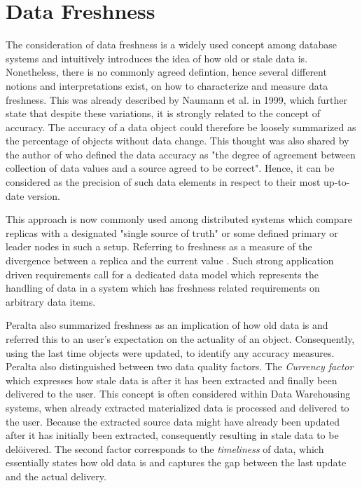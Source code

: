 \section{Data Freshness}
\label{sec:definition}
The consideration of data freshness is a widely used concept among database systems and intuitively introduces the idea of how old or stale data is.
Nonetheless, there is no commonly agreed defintion, hence several different notions and interpretations exist, on how to characterize and measure data freshness.
This was already described by Naumann et al. \cite{naumann:1999} in 1999, which further state that despite these variations, it is strongly related to the concept of accuracy. 
The accuracy of a data object could therefore be loosely summarized as the percentage of objects without data change. 
This thought was also shared by the author of \cite{redman:1996} who defined the data accuracy as "the degree of agreement between 
collection of data values and a source agreed to be correct".
Hence, it can be considered as the precision of such data elements in respect to their most up-to-date version.


This approach is now commonly used among distributed systems which compare replicas with a designated "single source of truth" or some defined 
primary or leader nodes in such a setup. Referring to freshness as a measure of the divergence between a replica and the current value \cite{cite}.
Such strong application driven requirements call for a dedicated data model which represents the handling of data in a system which has
freshness related requirements on arbitrary data items.


Peralta \cite{peralta:2006} also summarized freshness as an implication of how old data is and referred this to an user's expectation on the actuality of an object. 
Consequently, using the last time objects were updated, to identify any accuracy measures. Peralta also distinguished between two data quality factors. 
The \emph{Currency factor} which expresses how stale data is after it has been extracted and finally been
delivered to the user. This concept is often considered within Data Warehousing systems, when already extracted materialized data is processed and delivered to the user.
Because the extracted source data might have already been updated after it has initially been extracted, consequently resulting in stale data to be delöivered.
The second factor corresponds to the \emph{timeliness} of data, which essentially states how old data is and captures the gap between the last update and the actual delivery.



